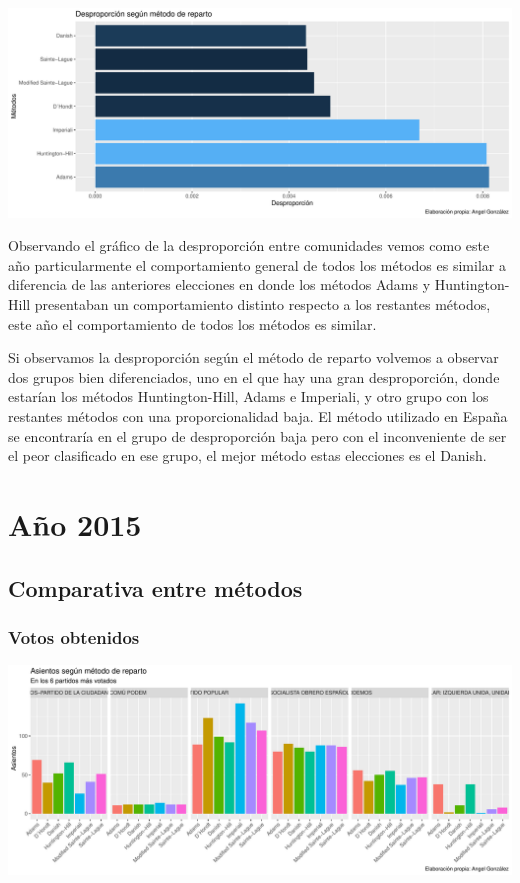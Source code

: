 \documentclass[12pt,a4paper,]{book}
\numberwithin{dummy}{section}
\theoremstyle{ocrenumbox}
\theoremstyle{blacknumex}
\theoremstyle{blacknumbox}
\theoremstyle{ocrenum}
\theoremstyle{ocrenum}
\begin{document}
\begin{center}\includegraphics[width=0.95\linewidth]{figurasR/unnamed-chunk-150-2} \end{center}

Observando el gráfico de la desproporción entre comunidades vemos como
este año particularmente el comportamiento general de todos los métodos
es similar a diferencia de las anteriores elecciones en donde los
métodos Adams y Huntington-Hill presentaban un comportamiento distinto
respecto a los restantes métodos, este año el comportamiento de todos
los métodos es similar.

Si observamos la desproporción según el método de reparto volvemos a
observar dos grupos bien diferenciados, uno en el que hay una gran
desproporción, donde estarían los métodos Huntington-Hill, Adams e
Imperiali, y otro grupo con los restantes métodos con una
proporcionalidad baja. El método utilizado en España se encontraría en
el grupo de desproporción baja pero con el inconveniente de ser el peor
clasificado en ese grupo, el mejor método estas elecciones es el Danish.

\hypertarget{auxf1o-2015}{%
\section{Año 2015}\label{auxf1o-2015}}

\hypertarget{comparativa-entre-muxe9todos-11}{%
\subsection{Comparativa entre
métodos}\label{comparativa-entre-muxe9todos-11}}

\hypertarget{votos-obtenidos-11}{%
\subsubsection{Votos obtenidos}\label{votos-obtenidos-11}}

\begin{center}\includegraphics[width=0.95\linewidth]{figurasR/unnamed-chunk-158-1} \end{center}
\end{document}
